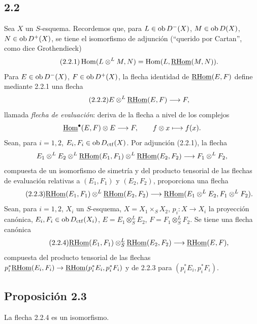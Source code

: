 \subsection*{2.2}
Sea $X$ un $S$-esquema. Recordemos que, para $L\in\operatorname{ob} D^{-}(X)$, $M\in\operatorname{ob} D(X)$, $N\in\operatorname{ob} D^{+}(X)$, se tiene el isomorfismo de adjunción (``querido por Cartan'', como dice Grothendieck)
\begin{equation}\tag{2.2.1}
\operatorname{Hom}(L\otimes^{L}M,N)=\operatorname{Hom}(L,\underline{\mathrm{RHom}}(M,N)).
\end{equation}
Para $E\in\operatorname{ob} D^{-}(X)$, $F\in\operatorname{ob} D^{+}(X)$, la flecha identidad de $\underline{\mathrm{RHom}}(E,F)$ define mediante 2.2.1 una flecha
\begin{equation}\tag{2.2.2}
E\otimes^{L}\underline{\mathrm{RHom}}(E,F)\longrightarrow F,
\end{equation}
llamada \emph{flecha de evaluación}: deriva de la flecha a nivel de los complejos
\[
\underline{\operatorname{Hom}}^{\bullet}(E,F)\otimes E\longrightarrow F,
\qquad f\otimes x\longmapsto f(x).
\]
Sean, para $i=1,2$, $E_i,F_i\in\operatorname{ob} D_{\mathrm{ctf}}(X)$. Por adjunción (2.2.1), la flecha
\[
E_1\otimes^{L}E_2\otimes^{L}\underline{\mathrm{RHom}}(E_1,F_1)\otimes^{L}\underline{\mathrm{RHom}}(E_2,F_2)\longrightarrow F_1\otimes^{L}F_2,
\]
compuesta de un isomorfismo de simetría y del producto tensorial de las flechas de evaluación relativas a $(E_1,F_1)$ y $(E_2,F_2)$, proporciona una flecha
\begin{equation}\tag{2.2.3}
\underline{\mathrm{RHom}}(E_1,F_1)\otimes^{L}\underline{\mathrm{RHom}}(E_2,F_2)\longrightarrow\underline{\mathrm{RHom}}(E_1\otimes^{L}E_2,F_1\otimes^{L}F_2).
\end{equation}
Sean, para $i=1,2$, $X_i$ un $S$-esquema, $X=X_1\times_SX_2$, $p_i:X\to X_i$ la proyección canónica, $E_i,F_i\in\operatorname{ob} D_{\mathrm{ctf}}(X_i)$, $E=E_1\otimes^{L}_{S}E_2$, $F=F_1\otimes^{L}_{S}F_2$. Se tiene una flecha canónica
\begin{equation}\tag{2.2.4}
\underline{\mathrm{RHom}}(E_1,F_1)\otimes^{L}_{S}\underline{\mathrm{RHom}}(E_2,F_2)\longrightarrow\underline{\mathrm{RHom}}(E,F),
\end{equation}
compuesta del producto tensorial de las flechas $p_i^{*}\underline{\mathrm{RHom}}(E_i,F_i)\to\underline{\mathrm{RHom}}(p_i^{*}E_i,p_i^{*}F_i)$ y de 2.2.3 para $(p_i^{*}E_i,p_i^{*}F_i)$.

\subsection*{Proposición 2.3}
La flecha 2.2.4 es un isomorfismo.

